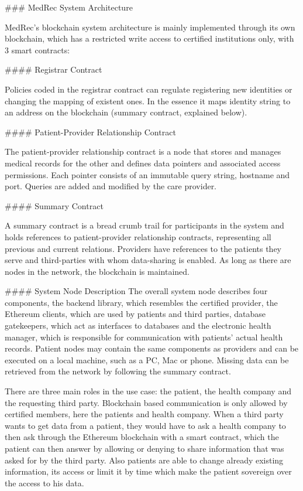 ### MedRec System Architecture

MedRec's blockchain system architecture is mainly implemented through its own blockchain, which has a restricted write access to
certified institutions only, with 3 smart contracts:

#### Registrar Contract


Policies coded in the registrar contract can regulate registering new identities or changing the mapping of existent ones.
In the essence it maps identity string to an address on the blockchain (summary contract, explained below).


#### Patient-Provider Relationship Contract

The patient-provider relationship contract is a node that stores and manages medical records for the other and defines
data pointers and associated access permissions. Each pointer consists of an immutable query string, hostname and port.
Queries are added and modified by the care provider.


#### Summary Contract

A summary contract is a bread crumb trail for participants in the system and holds references to patient-provider relationship
contracts, representing all previous and current relations. Providers have references to the patients they serve and third-parties
with whom data-sharing is enabled. As long as there are nodes in the network, the blockchain is maintained.


#### System Node Description
The overall system node describes four components, the backend library, which resembles the certified provider, the
Ethereum clients, which are used by patients and third parties, database gatekeepers, which act as interfaces to databases
and the electronic health manager, which is responsible for communication with patients' actual health records.
Patient nodes may contain the same components as providers and can be executed on a local machine, such as a PC, Mac or phone.
Missing data can be retrieved from the network by following the summary contract.


There are three main roles in the use case: the patient, the health company and the requesting third party.
Blockchain based communication is only allowed by certified members, here the patients and health company.
When a third party wants to get data from a patient, they would have to ask a health company to then ask through the
Ethereum blockchain with a smart contract, which the patient can then answer by allowing or denying to share
information that was asked for by the third party.
Also patients are able to change already existing information, its access or limit it by time which make the patient
sovereign over the access to his data.


